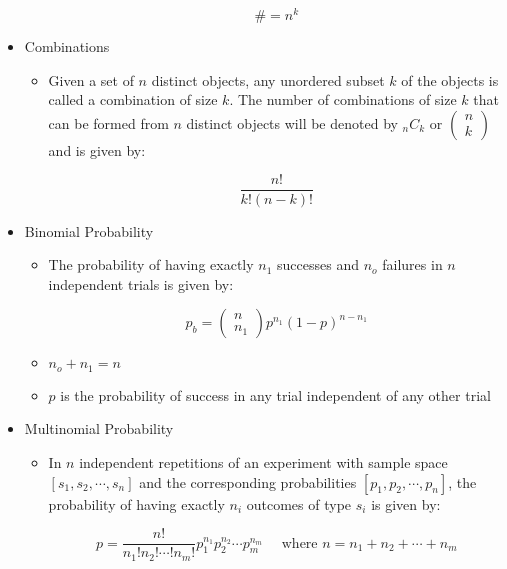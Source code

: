 \begin{itemize}
\begin{itemize}
        $$\#=n^k$$

    \end{itemize}

  \item Combinations

    \begin{itemize}

      \item Given a set of $n$ distinct objects, any unordered subset $k$ of the objects is called a combination of size $k$. The number of combinations of size $k$ that can be formed from $n$ distinct objects will be denoted by $_nC_k$ or $\left( \begin{matrix} n\\k\end{matrix} \right)$ and is given by:

        $$\frac{n!}{k!(n-k)!}$$

    \end{itemize}

  \item Binomial Probability

    \begin{itemize}

      \item The probability of having exactly $n_1$ successes and $n_o$ failures in $n$ independent trials is given by:

        $$p_b=\left( \begin{matrix} n\\n_1\end{matrix} \right)p^{n_1}(1-p)^{n-n_1}$$

      \item $n_o+n_1=n$

      \item $p$ is the probability of success in any trial independent of any other trial

    \end{itemize}

  \item Multinomial Probability

    \begin{itemize}
        
      \item In $n$ independent repetitions of an experiment with sample space $\left[ s_1,s_2,\cdots,s_n \right]$ and the corresponding probabilities $\left[ p_1,p_2,\cdots,p_n \right]$, the probability of having exactly $n_i$ outcomes of type $s_i$ is given by:

        $$p=\frac{n!}{n_1!n_2!\cdots!n_m!}p_1^{n_1}p_2^{n_2}\cdots p_m^{n_m}\quad\text{ where }n=n_1+n_2+\cdots+n_m$$

    \end{itemize}

\end{itemize}



